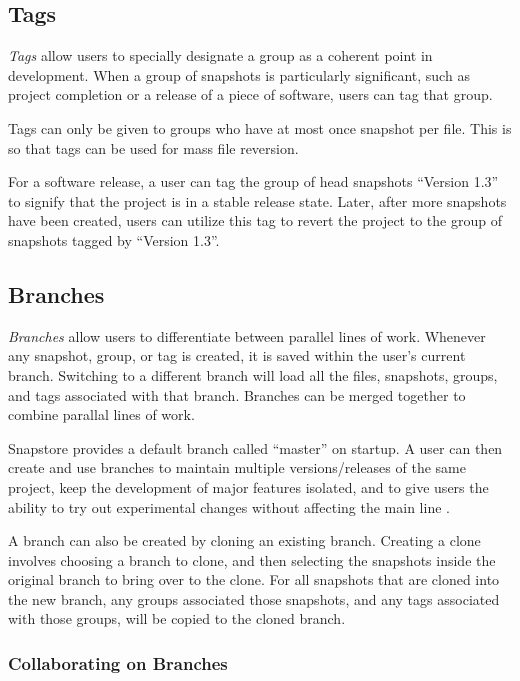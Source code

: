 \subsection{Tags}

\textit{Tags} allow users to specially designate a group as a coherent point in development. When a group of snapshots is particularly significant, such as project completion or a release of a piece of software, users can tag that group.

Tags can only be given to groups who have at most once snapshot per file. This is so that tags can be used for mass file reversion.

For a software release, a user can tag the group of head snapshots ``Version 1.3'' to signify that the project is in a stable release state. Later, after more snapshots have been created, users can utilize this tag to revert the project to the group of snapshots tagged by ``Version 1.3''.

\subsection{Branches}

\textit{Branches} allow users to differentiate between parallel lines of work. Whenever any snapshot, group, or tag is created, it is saved within the user's current branch. Switching to a different branch will load all the files, snapshots, groups, and tags associated with that branch. Branches can be merged together to combine parallal lines of work.

Snapstore provides a default branch called ``master'' on startup. A user can then create and use branches to maintain multiple versions/releases of the same project, keep the development of major features isolated, and to give users the ability to try out experimental changes without affecting the main line \cite{RossoJackson}.

A branch can also be created by cloning an existing branch. Creating a clone involves choosing a branch to clone, and then selecting the snapshots inside the original branch to bring over to the clone. For all snapshots that are cloned into the new branch, any groups associated those snapshots, and any tags associated with those groups, will be copied to the cloned branch.

\subsubsection{Collaborating on Branches}

